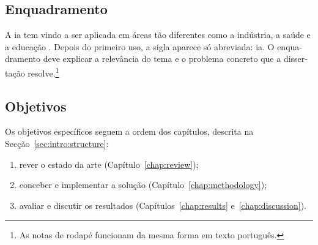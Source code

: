 \begin{otherlanguage}{portuguese}

\subsection{Enquadramento}

A \gls{ia} tem vindo a ser aplicada em áreas tão diferentes como a
indústria, a saúde e a educação \cite{Goodfellow2016}. Depois do primeiro
uso, a sigla aparece só abreviada: \gls{ia}. O enquadramento deve explicar
a relevância do tema e o problema concreto que a dissertação
resolve.\footnote{As notas de rodapé funcionam da mesma forma em texto
português.}

\subsection{Objetivos}

Os objetivos específicos seguem a ordem dos capítulos, descrita na
Secção~\ref{sec:intro:structure}:

\begin{enumerate}
  \item rever o estado da arte (Capítulo~\ref{chap:review});
  \item conceber e implementar a solução (Capítulo~\ref{chap:methodology});
  \item avaliar e discutir os resultados (Capítulos~\ref{chap:results}
        e~\ref{chap:discussion}).
\end{enumerate}

\end{otherlanguage}
